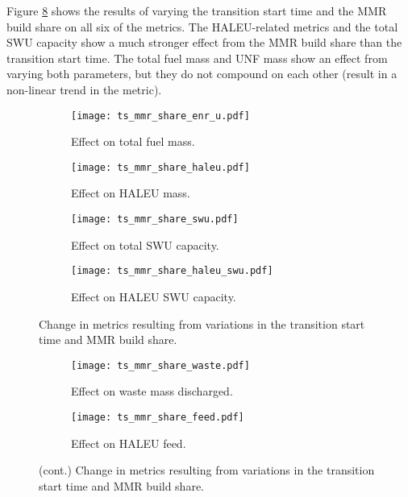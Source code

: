 Figure \ref{fig:ts_mmr_share} shows the results of varying the 
transition start time and the \gls{MMR} build share on all 
six of the metrics. The \gls{HALEU}-related metrics and the total 
\gls{SWU} capacity show a much stronger effect from the \gls{MMR} 
build share than the transition start time. The total fuel mass 
and \gls{UNF} mass show an effect from varying both parameters, 
but they do not compound on each other (result in a non-linear 
trend in the metric). 

\begin{figure}
    \begin{subfigure}[h!]{0.48\textwidth}
        \centering
        \texttt{[image: ts\_mmr\_share\_enr\_u.pdf]}
        \caption{Effect on total fuel mass.}
        \label{fig:ts_mmr_share_enr_u}
    \end{subfigure}
    \hfill
    \begin{subfigure}[h!]{0.48\textwidth}
        \centering
        \texttt{[image: ts\_mmr\_share\_haleu.pdf]}
        \caption{Effect on HALEU mass.}
        \label{fig:ts_mmr_share_haleu}
    \end{subfigure}
    
    \begin{subfigure}[h!]{0.48\textwidth}
        \centering
        \texttt{[image: ts\_mmr\_share\_swu.pdf]}
        \caption{Effect on total SWU capacity.}
        \label{fig:ts_mmr_share_swu}
    \end{subfigure}
    \hfill
    \begin{subfigure}[h!]{0.48\textwidth}
        \centering
        \texttt{[image: ts\_mmr\_share\_haleu\_swu.pdf]}
        \caption{Effect on HALEU SWU capacity.}
        \label{fig:ts_mmr_share_haleu_swu}
    \end{subfigure}
    \caption{Change in metrics resulting from variations in the 
    transition start time and MMR build share.}
\end{figure}

\begin{figure}
    \ContinuedFloat
    \begin{subfigure}[h!]{0.48\textwidth}
        \centering
        \texttt{[image: ts\_mmr\_share\_waste.pdf]}
        \caption{Effect on waste mass discharged.}
        \label{fig:ts_mmr_share_waste}
    \end{subfigure}
    \hfill
    \begin{subfigure}[h!]{0.48\textwidth}
        \centering
        \texttt{[image: ts\_mmr\_share\_feed.pdf]}
        \caption{Effect on HALEU feed.}
        \label{fig:ts_mmr_share_feed}
    \end{subfigure}
    \caption{(cont.) Change in metrics resulting from variations in the 
    transition start time and MMR build share.}
    \label{fig:ts_mmr_share}
\end{figure}

